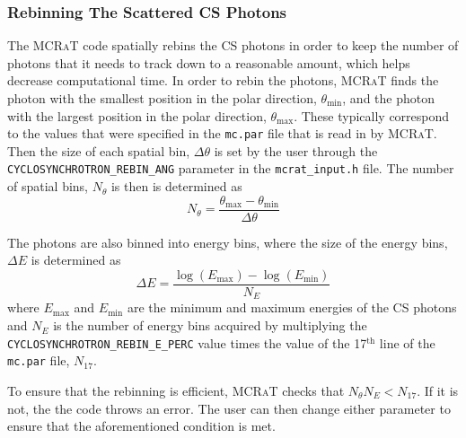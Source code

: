 \documentclass[12pt,a4paper]{article}
\newcommand{\mcrat}{\textsc{MCRaT}}
\begin{document}
\subsubsection{Rebinning The Scattered CS Photons}
The \mcrat{} code spatially rebins the CS photons in order to keep the number of photons that it needs to track down to a reasonable amount, which helps decrease computational time. In order to rebin the photons, \mcrat{} finds the photon with the smallest position in the polar direction, $\theta_\mathrm{min}$,  and the photon with the largest position in the polar direction, $\theta_\mathrm{max}$. These typically correspond to the values that were specified in the \texttt{mc.par} file that is read in by \mcrat{}. Then the size of each spatial bin, $\Delta \theta$ is set by the user through the \texttt{CYCLOSYNCHROTRON\_REBIN\_ANG} parameter in the \texttt{mcrat\_input.h} file. The number of spatial bins, $N_\theta$ is then is determined as
\begin{equation}
N_\theta=\frac{\theta_\mathrm{max}-\theta_\mathrm{min}}{\Delta \theta}
\end{equation}

The photons are also binned into energy bins, where the size of the energy bins, $\Delta E$ is determined as 
\begin{equation}
\Delta E=\frac{\log(E_\mathrm{max})-\log(E_\mathrm{min})}{N_E}
\end{equation}
where $E_\mathrm{max}$ and $E_\mathrm{min}$ are the minimum and maximum energies of the CS photons and $N_E$ is the number of energy bins acquired by multiplying the \texttt{CYCLOSYNCHROTRON\_REBIN\_E\_PERC} value times the value of the 17$^\textrm{th}$ line of the \texttt{mc.par} file, $N_{17}$.

To ensure that the rebinning is efficient, \mcrat{} checks that $N_\theta N_E<N_{17}$. If it is not, the the code throws an error. The user can then change either parameter to ensure that the aforementioned condition is met.
\end{document}
